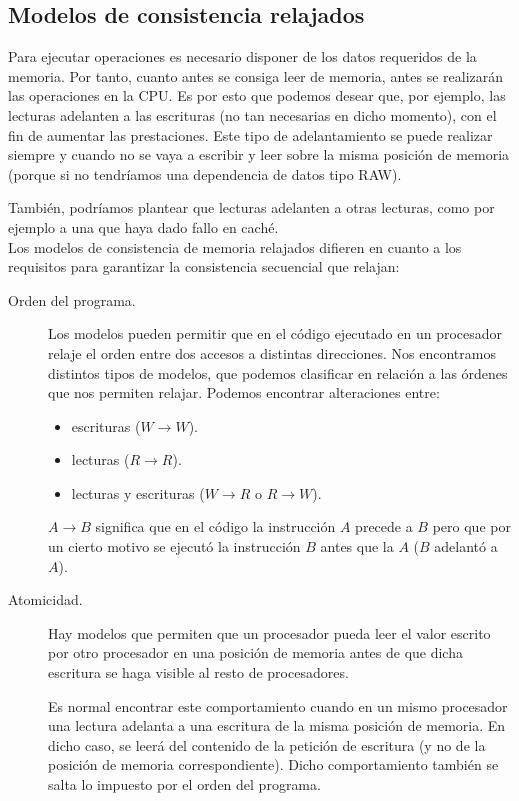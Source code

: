 \subsection{Modelos de consistencia relajados}
Para ejecutar operaciones es necesario disponer de los datos requeridos de la memoria. Por tanto, cuanto antes se consiga leer de memoria, antes se realizarán las operaciones en la CPU\@. Es por esto que podemos desear que, por ejemplo, las lecturas adelanten a las escrituras (no tan necesarias en dicho momento), con el fin de aumentar las prestaciones. Este tipo de adelantamiento se puede realizar siempre y cuando no se vaya a escribir y leer sobre la misma posición de memoria (porque si no tendríamos una dependencia de datos tipo RAW).

También, podríamos plantear que lecturas adelanten a otras lecturas, como por ejemplo a una que haya dado fallo en caché.\\

Los modelos de consistencia de memoria relajados difieren en cuanto a los requisitos para garantizar la consistencia secuencial que relajan:
\begin{description}
    \item [Orden del programa.] Los modelos pueden permitir que en el código ejecutado en un procesador relaje el orden entre dos accesos a distintas direcciones. Nos encontramos distintos tipos de modelos, que podemos clasificar en relación a las órdenes que nos permiten relajar. Podemos encontrar alteraciones entre:
        \begin{itemize}
            \item escrituras ($W\rightarrow W$).
            \item lecturas ($R\rightarrow R$).
            \item lecturas y escrituras ($W\rightarrow R$ o $R\rightarrow W$).
        \end{itemize}
        $A\rightarrow B$ significa que en el código la instrucción $A$ precede a $B$ pero que por un cierto motivo se ejecutó la instrucción $B$ antes que la $A$ ($B$ adelantó a $A$).
    \item [Atomicidad.] Hay modelos que permiten que un procesador pueda leer el valor escrito por otro procesador en una posición de memoria antes de que dicha escritura se haga visible al resto de procesadores. 

        Es normal encontrar este comportamiento cuando en un mismo procesador una lectura adelanta a una escritura de la misma posición de memoria. En dicho caso, se leerá del contenido de la petición de escritura (y no de la posición de memoria correspondiente). Dicho comportamiento también se salta lo impuesto por el orden del programa.
\end{description}

